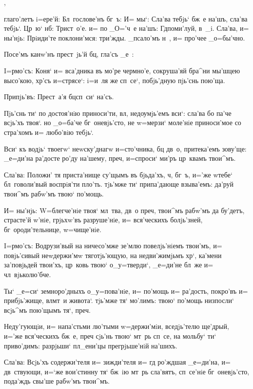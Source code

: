 ,

глаго'летъ i=ере'й: Бл~гослове'нъ бг~ъ: И= мы`: Сла'ва 
тебjь` бж~е на'шъ, сла'ва тебjь`. Цр~ю` нб: 
Трист~о'е. и= по _О='ч~е на'шъ: Гд поми'луй, в~_i. 
Сла'ва, и= ны'нjь: Прiиди'те поклони'мся: три'жды. 
_псало'мъ н~, и= про'чее _о=бы'чно.

Посе'мъ канw'нъ прест~jь'й бц, гла'съ _е~:


I=рмо'съ: Коня` и= вса'дника въ мо'ре чермно'е, 
сокруша'яй бра^ни мы'шцею высо'кою, хр'съ и=стрясе`: 
i=и~ля же сп~се`, побjь'дную пjь'снь пою'ща. 

Припjь'въ: Прест~а'я бц сп~си` на'съ.

Пjь'снь ти` по достоя'нiю приноси'ти, вл, 
недоумjь'емъ вси`: сла'ва бо па'че всjь'хъ твоя`. но 
_о=ба'че бг~оневjь'сто, не w=мерзи` моле'нiе приноси'мое 
со стра'хомъ и= любо'вiю тебjь`.

Вси` къ водjь` твоегw` неwску'днагw и=сто'чника, бц 
дв~о, притека'емъ зову'ще: _е=ди'на ра'досте ро'ду 
на'шему, преч, и=спроси` ми'ръ цр~квамъ твои^мъ.

Сла'ва: Положи' тя приста'нище су'щымъ въ бjьда'хъ, 
ч, бг~ъ, и='же w\т тебе` бл~говоли'вый воспрiя'ти 
пло'ть. тjь'мже ти` припа'дающе взыва'емъ: да'руй твои^мъ 
рабw'мъ твою` по'мощь.

И= ны'нjь: W=блегче'нiе твоя` мл~тва, дв~о преч, 
твои^мъ рабw'мъ да бу'детъ, страсте'й w'нiе, 
грjьхw'въ разруше'нiе, и= вся'ческихъ болjь'зней, 
бг~ороди'тельнице, w=чище'нiе.


I=рмо'съ: Водрузи'вый на ничесо'мже зе'млю 
повелjь'нiемъ твои'мъ, и= повjь'сивый неwдержи'мw 
тяготjь'ющую, на недви'жимjьмъ хр`, ка'мени 
за'повjьдей твои'хъ, цр~ковь твою` о_у=тверди`, _е=ди'не 
бл~же и= чл~вjьколю'бче.

Ты` _е=си` земноро'дныхъ о_у=пова'нiе, и= по'мощь и= 
ра'дость, покро'въ и= прибjь'жище, вл мт~и живота`. 
тjь'мже тя` мо'лимъ: твою` по'мощь низпосли` всjь^мъ 
пою'щымъ тя`, преч.

Неду'гующiи, и= напа'стьми лю'тыми w=держи'мiи, 
вседjь'телю ще'дрый, и='же вся'ческихъ бж~е, преч 
сjь'нь твою` мт~рь сп~се, на мольбу` ти` приво'димъ: 
разрjьши` пл_ени'цы прегрjьше'нiй на'шихъ.

Сла'ва: Всjь'хъ содержи'теля и= зижди'теля и= гд 
ро'ждшая _е=ди'на, и= дв~ствующи, и=`же вои'стинну тя` 
бж~iю мт~рь сла'вятъ, сп~се'нiе бг~оневjь'сто, пода'ждь 
свы'ше рабw'мъ твои^мъ.

